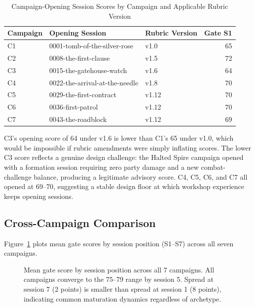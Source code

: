 \begin{table}[t]
\caption{Campaign-Opening Session Scores by Campaign and Applicable Rubric Version}
\label{tab:version-control}
\begin{tabular}{@{}lllr@{}}
\toprule
Campaign & Opening Session & Rubric Version & Gate S1 \\
\midrule
C1 & 0001-tomb-of-the-silver-rose & v1.0 & 65 \\
C2 & 0008-the-first-clause & v1.5 & 72 \\
C3 & 0015-the-gatehouse-watch & v1.6 & 64 \\
C4 & 0022-the-arrival-at-the-needle & v1.8 & 70 \\
C5 & 0029-the-first-contract & v1.12 & 70 \\
C6 & 0036-first-patrol & v1.12 & 70 \\
C7 & 0043-the-roadblock & v1.12 & 69 \\
\bottomrule
\end{tabular}
\end{table}

C3's opening score of 64 under v1.6 is lower than C1's 65 under v1.0, which would be
impossible if rubric amendments were simply inflating scores. The lower C3 score reflects
a genuine design challenge: the Halted Spire campaign opened with a formation session
requiring zero party damage and a new combat-challenge balance, producing a legitimate
advisory score. C4, C5, C6, and C7 all opened at 69--70, suggesting a stable design
floor at which workshop experience keeps opening sessions.

\subsection{Cross-Campaign Comparison}

Figure~\ref{fig:cross-campaign} plots mean gate scores by session position (S1--S7)
across all seven campaigns.

\begin{figure}[t]
  \centering
  \caption{Mean gate score by session position across all 7 campaigns.
    All campaigns converge to the 75--79 range by session 5.
    Spread at session 7 (2 points) is smaller than spread at session 1 (8 points),
    indicating common maturation dynamics regardless of archetype.}
  \label{fig:cross-campaign}
\end{figure}

